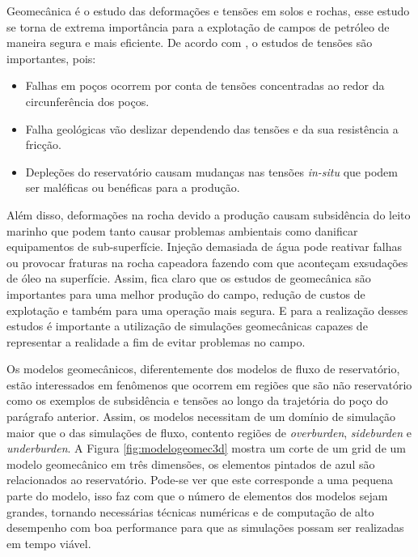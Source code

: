 

Geomecânica é o estudo das deformações e tensões em solos e rochas, esse estudo se torna de extrema importância para a explotação de campos de petróleo de maneira segura e mais eficiente. De acordo com \citet{ResGeomec}, o estudos de tensões são importantes, pois:

\begin{itemize}
    \item Falhas em poços ocorrem por conta de tensões concentradas ao redor da circunferência dos poços.
    \item Falha geológicas vão deslizar dependendo das tensões e da sua resistência a fricção. 
    \item Depleções do reservatório causam mudanças nas tensões \textit{in-situ} que podem ser maléficas ou benéficas para a produção.
\end{itemize}

Além disso, deformações na rocha devido a produção causam subsidência do leito marinho que podem tanto causar problemas ambientais como danificar equipamentos de sub-superfície. Injeção demasiada de água  pode reativar falhas ou provocar fraturas na rocha capeadora fazendo com que aconteçam exsudações de óleo na superfície. Assim, fica claro que os estudos de geomecânica são importantes para uma melhor produção do campo, redução de custos de explotação e também para uma operação mais segura.  E para a realização desses estudos é importante a utilização de simulações geomecânicas capazes de representar a realidade a fim de evitar problemas no campo.

Os modelos geomecânicos, diferentemente dos modelos de fluxo de reservatório, estão interessados em fenômenos que ocorrem em regiões que são não reservatório como os exemplos de subsidência e tensões ao longo da trajetória do poço do parágrafo anterior. Assim, os modelos necessitam de um domínio de simulação maior que o das simulações de fluxo, contento regiões de \textit{overburden}, \textit{sideburden} e \textit{underburden}. A Figura \ref{fig:modelogeomec3d} mostra um corte de um grid de um modelo geomecânico em três dimensões, os elementos pintados de azul são relacionados ao reservatório. Pode-se ver que este corresponde a uma pequena parte do modelo, isso faz com que o número de elementos dos  modelos sejam grandes, tornando necessárias técnicas numéricas e de computação de alto desempenho com boa performance para que as simulações possam ser realizadas em tempo viável. 



